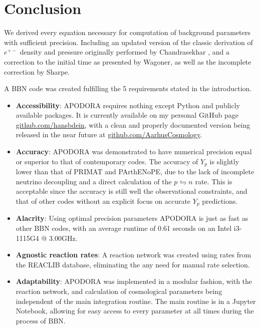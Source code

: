 








\chapter{Conclusion}
\label{chap:Conclusion}

We derived every equation necessary for computation of background parameters with sufficient precision. Including an updated version of the classic derivation of $e^{+-}$ density and pressure originally performed by Chandrasekhar \cite{Chandrasekhar}, and a correction to the initial time as presented by Wagoner\cite{Wagoner67}, as well as the incomplete correction by Sharpe\cite{sharpe2021big}. 

\noindent A BBN code was created fulfilling the 5 requirements stated in the introduction.
\begin{itemize}
    \item \textbf{Accessibility}: APODORA requires nothing except Python and publicly available packages. It is currently available on my personal GitHub page \url{github.com/hansbdein}, with a clean and properly documented version being released in the near future at \url{github.com/AarhusCosmology}.
    \item \textbf{Accuracy}: APODORA was demonstrated to have numerical precision equal or superior to that of contemporary codes. The accuracy of $Y_p$ is slightly lower than that of PRIMAT and PArthENoPE, due to the lack of incomplete neutrino decoupling and a direct calculation of the $p\leftrightharpoons n$ rate. This is acceptable since the accuracy is still well the observational constraints, and that of other codes without an explicit focus on accurate $Y_p$ predictions.
    \item \textbf{Alacrity}: Using optimal precision parameters APODORA is just as fast as other BBN codes, with an average runtime of 0.61 seconds on an Intel i3-1115G4 @ 3.00GHz.
    \item \textbf{Agnostic reaction rates}: A reaction network was created using rates from the REACLIB database\cite{REACLIB}, eliminating the any need for manual rate selection.
    \item \textbf{Adaptability}: APODORA was implemented in a modular fashion, with the reaction network, and calculation of cosmological parameters being independent of the main integration routine. The main routine is in a Jupyter Notebook, allowing for easy access to every parameter at all times during the process of BBN. 
\end{itemize}




